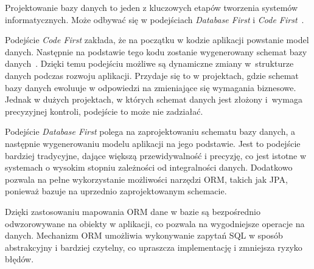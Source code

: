 Projektowanie bazy danych to jeden z kluczowych etapów tworzenia systemów informatycznych. Może odbywać się w podejściach \emph{Database First} i \emph{Code First}~\cite{DB_FIRST_VS_CODE_FIRST_1,DB_FIRST_VS_CODE_FIRST_2}. 

Podejście \emph{Code First} zakłada, że na początku w kodzie aplikacji powstanie model danych. Następnie na podstawie tego kodu zostanie wygenerowany schemat bazy danych~\cite{CODE_FIRST}. Dzięki temu podejściu możliwe są dynamiczne zmiany w~strukturze danych podczas rozwoju aplikacji. Przydaje się to w projektach, gdzie schemat bazy danych ewoluuje w odpowiedzi na zmieniające się wymagania biznesowe. Jednak w dużych projektach, w których schemat danych jest złożony i~wymaga precyzyjnej kontroli, podejście to może nie zadziałać.

Podejście \emph{Database First} polega na zaprojektowaniu schematu bazy danych, a następnie wygenerowaniu modelu aplikacji na jego podstawie. Jest to podejście bardziej tradycyjne, dające większą przewidywalność i precyzję, co jest istotne w systemach o wysokim stopniu zależności od integralności danych. Dodatkowo pozwala na pełne wykorzystanie możliwości narzędzi ORM, takich jak JPA, ponieważ bazuje na uprzednio zaprojektowanym schemacie. 

Dzięki zastosowaniu mapowania ORM dane w bazie są bezpośrednio odwzorowywane na obiekty w aplikacji, co pozwala na wygodniejsze operacje na danych. Mechanizm ORM umożliwia wykonywanie zapytań SQL w sposób abstrakcyjny i bardziej czytelny, co upraszcza implementację i zmniejsza ryzyko błędów.

